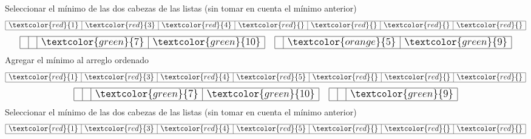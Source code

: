 \documentclass{article}
\begin{document}
\begin{minipage}{0.5\textwidth}
  Seleccionar el mínimo de las dos cabezas de las listas (sin tomar en cuenta el mínimo anterior)
  \begin{equation*}
    \large
    \begin{array}{|r|r|r|r|r|r|r|}
      \hline \textcolor{red}{1} & \textcolor{red}{3} & \textcolor{red}{4} & \textcolor{red}{} & \textcolor{red}{} & \textcolor{red}{} & \textcolor{red}{} \\ \hline
    \end{array}
  \end{equation*}
  \begin{equation*}
    \large
    \begin{array}{|r|r|r|r|}
      \hline & & \textcolor{green}{7} & \textcolor{green}{10} \\ \hline
    \end{array}\quad 
    \begin{array}{|r|r|r|}
      \hline & \textcolor{orange}{5} & \textcolor{green}{9} \\ \hline
    \end{array}
  \end{equation*}
  Agregar el mínimo al arreglo ordenado
  \begin{equation*}
    \large
    \begin{array}{|r|r|r|r|r|r|r|}
      \hline \textcolor{red}{1} & \textcolor{red}{3} & \textcolor{red}{4} & \textcolor{red}{5} & \textcolor{red}{} & \textcolor{red}{} & \textcolor{red}{} \\ \hline
    \end{array}
  \end{equation*}
  \begin{equation*}
    \large
    \begin{array}{|r|r|r|r|}
      \hline & & \textcolor{green}{7} & \textcolor{green}{10} \\ \hline
    \end{array}\quad 
    \begin{array}{|r|r|r|}
      \hline &  & \textcolor{green}{9} \\ \hline
    \end{array}
  \end{equation*}
  Seleccionar el mínimo de las dos cabezas de las listas (sin tomar en cuenta el mínimo anterior)
  \begin{equation*}
    \large
    \begin{array}{|r|r|r|r|r|r|r|}
      \hline \textcolor{red}{1} & \textcolor{red}{3} & \textcolor{red}{4} & \textcolor{red}{5} & \textcolor{red}{} & \textcolor{red}{} & \textcolor{red}{} \\ \hline

\end{array}
\end{equation*}
\end{minipage}
\end{document}
